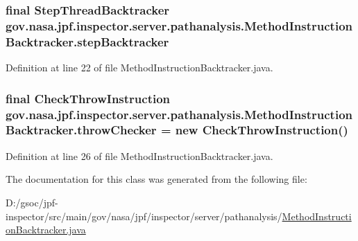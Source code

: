 \subsubsection[{\texorpdfstring{step\+Backtracker}{stepBacktracker}}]{\setlength{\rightskip}{0pt plus 5cm}final {\bf Step\+Thread\+Backtracker} gov.\+nasa.\+jpf.\+inspector.\+server.\+pathanalysis.\+Method\+Instruction\+Backtracker.\+step\+Backtracker\hspace{0.3cm}{\ttfamily [private]}}\hypertarget{classgov_1_1nasa_1_1jpf_1_1inspector_1_1server_1_1pathanalysis_1_1_method_instruction_backtracker_a2ea6804df5ef427d2fca79d59ca9ce54}{}\label{classgov_1_1nasa_1_1jpf_1_1inspector_1_1server_1_1pathanalysis_1_1_method_instruction_backtracker_a2ea6804df5ef427d2fca79d59ca9ce54}


Definition at line 22 of file Method\+Instruction\+Backtracker.\+java.

\subsubsection[{\texorpdfstring{throw\+Checker}{throwChecker}}]{\setlength{\rightskip}{0pt plus 5cm}final {\bf Check\+Throw\+Instruction} gov.\+nasa.\+jpf.\+inspector.\+server.\+pathanalysis.\+Method\+Instruction\+Backtracker.\+throw\+Checker = new {\bf Check\+Throw\+Instruction}()\hspace{0.3cm}{\ttfamily [private]}}\hypertarget{classgov_1_1nasa_1_1jpf_1_1inspector_1_1server_1_1pathanalysis_1_1_method_instruction_backtracker_abac678f2b4e0d6701d013a196f31649c}{}\label{classgov_1_1nasa_1_1jpf_1_1inspector_1_1server_1_1pathanalysis_1_1_method_instruction_backtracker_abac678f2b4e0d6701d013a196f31649c}


Definition at line 26 of file Method\+Instruction\+Backtracker.\+java.



The documentation for this class was generated from the following file\+:\begin{DoxyCompactItemize}
\item 
D\+:/gsoc/jpf-\/inspector/src/main/gov/nasa/jpf/inspector/server/pathanalysis/\hyperlink{_method_instruction_backtracker_8java}{Method\+Instruction\+Backtracker.\+java}\end{DoxyCompactItemize}
